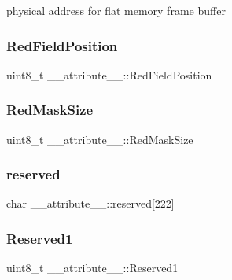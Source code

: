 physical address for flat memory frame buffer 

\hypertarget{struct____attribute_____a8b5b2e458757061bce7e056f7f910dae}{}\label{struct____attribute_____a8b5b2e458757061bce7e056f7f910dae} 
\subsubsection{\texorpdfstring{Red\+Field\+Position}{RedFieldPosition}}
{\footnotesize\ttfamily uint8\+\_\+t \+\_\+\+\_\+attribute\+\_\+\+\_\+\+::\+Red\+Field\+Position}

\hypertarget{struct____attribute_____a9ffc14e11d6b1c80b63aba344292849e}{}\label{struct____attribute_____a9ffc14e11d6b1c80b63aba344292849e} 
\subsubsection{\texorpdfstring{Red\+Mask\+Size}{RedMaskSize}}
{\footnotesize\ttfamily uint8\+\_\+t \+\_\+\+\_\+attribute\+\_\+\+\_\+\+::\+Red\+Mask\+Size}

\hypertarget{struct____attribute_____a009ec7baf4ee08c85717a2d5c63a277b}{}\label{struct____attribute_____a009ec7baf4ee08c85717a2d5c63a277b} 
\subsubsection{\texorpdfstring{reserved}{reserved}}
{\footnotesize\ttfamily char \+\_\+\+\_\+attribute\+\_\+\+\_\+\+::reserved\mbox{[}222\mbox{]}}

\hypertarget{struct____attribute_____a8ace2dfe4814abc401442986ac8a5356}{}\label{struct____attribute_____a8ace2dfe4814abc401442986ac8a5356} 
\subsubsection{\texorpdfstring{Reserved1}{Reserved1}}
{\footnotesize\ttfamily uint8\+\_\+t \+\_\+\+\_\+attribute\+\_\+\+\_\+\+::\+Reserved1}



